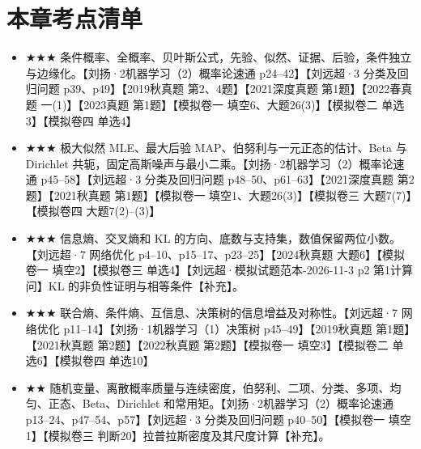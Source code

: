 \documentclass[UTF8,a4paper,zihao=-4,fontset=fandol]{ctexrep}
\begin{document}
\section{本章考点清单}
\begin{itemize}[leftmargin=2em]
\item \(\bigstar \bigstar \bigstar\) 条件概率、全概率、贝叶斯公式，先验、似然、证据、后验，条件独立与边缘化。【刘扬·2机器学习（2）概率论速通 p24--42】【刘远超·3 分类及回归问题 p39、p49】【2019秋真题 第2、4题】【2021深度真题 第1题】【2022春真题 一(1)】【2023真题 第1题】【模拟卷一 填空6、大题26(3)】【模拟卷二 单选3】【模拟卷四 单选4】
\item \(\bigstar \bigstar \bigstar\) 极大似然 MLE、最大后验 MAP、伯努利与一元正态的估计、Beta 与 Dirichlet 共轭，固定高斯噪声与最小二乘。【刘扬·2机器学习（2）概率论速通 p45--58】【刘远超·3 分类及回归问题 p48--50、p61--63】【2021深度真题 第2题】【2021秋真题 第1题】【模拟卷一 填空1、大题26(3)】【模拟卷三 大题7(7)】【模拟卷四 大题7(2)--(3)】
\item \(\bigstar \bigstar \bigstar\) 信息熵、交叉熵和 KL 的方向、底数与支持集，数值保留两位小数。【刘远超·7 网络优化 p4--10、p15--17、p23--25】【2024秋真题 大题6】【模拟卷一 填空2】【模拟卷三 单选4】【刘远超·模拟试题范本-2026-11-3 p2 第1计算问】KL 的非负性证明与相等条件【补充】。
\item \(\bigstar \bigstar \bigstar\) 联合熵、条件熵、互信息、决策树的信息增益及对称性。【刘远超·7 网络优化 p11--14】【刘扬·1机器学习（1）决策树 p45--49】【2019秋真题 第1题】【2021秋真题 第2题】【2022秋真题 第2题】【模拟卷一 填空3】【模拟卷二 单选6】【模拟卷四 单选10】
\item \(\bigstar \bigstar\) 随机变量、离散概率质量与连续密度，伯努利、二项、分类、多项、均匀、正态、Beta、Dirichlet 和常用矩。【刘扬·2机器学习（2）概率论速通 p13--24、p47--54、p57】【刘远超·3 分类及回归问题 p40--50】【模拟卷一 填空1】【模拟卷三 判断20】拉普拉斯密度及其尺度计算【补充】。
\end{itemize}
\end{document}
